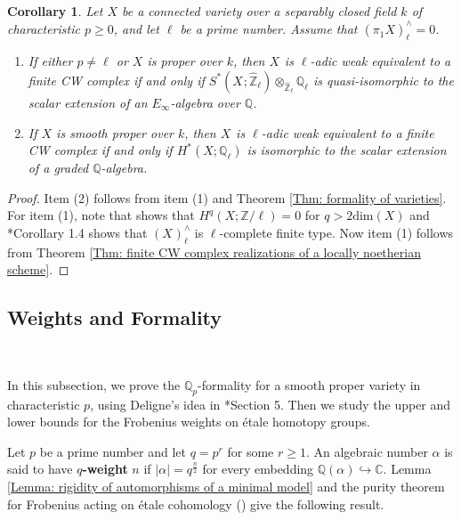 \documentclass[11pt]{amsart}
\newtheorem{corollary}[theorem]{Corollary}
\theoremstyle{definition}
\numberwithin{equation}{section}
\numberwithin{equation}{section}
\newcommand\QQ{\mathbb{Q}}
\newcommand\CC{\mathbb{C}}
\newcommand\ZZ{\mathbb{Z}}
\DeclareMathOperator{\et}{\acute{e}t}
\begin{document}
\begin{corollary}\label{Cor: finite CW complex for positive haract3eristic variety}
Let $X$ be a connected variety over a separably closed field $k$ of characteristic $p\geq 0$, and let $\ell$ be a prime number. Assume that $(\pi_1^{\et}X)^{\wedge}_{\ell}=0$.
\begin{enumerate}[leftmargin=0.25in]
    \item If either $p\neq \ell$ or $X$ is proper over $k$, then $X_{\et}$ is $\ell$-adic weak equivalent to a finite CW complex if and only if $S^*(X_{\et};\widehat{\ZZ}_{\ell})\otimes_{\widehat{\ZZ}_{\ell}} \QQ_{\ell}$ is quasi-isomorphic to the scalar extension of an $E_{\infty}$-algebra over $\QQ$.
    \item If $X$ is smooth proper over $k$, then $X_{\et}$ is $\ell$-adic weak equivalent to a finite CW complex if and only if $H^*_{\et}(X;\QQ_{\ell})$ is isomorphic to the scalar extension of a graded $\QQ$-algebra. 
\end{enumerate}
\end{corollary}

\begin{proof}
Item (2) follows from item (1) and Theorem \ref{Thm: formality of varieties}. For item (1), note that \cite[VI, Theorem 1.1]{milneLEC} shows that $H^q_{\et}(X;\mathbb{Z}/\ell)=0$ for $q> 2 \mathrm{dim}(X)$ and \cite{Hu-Zhang-formal-manifold-structures}*{Corollary 1.4} shows that $(X_{\et})^{\wedge}_{\ell}$ is $\ell$-complete finite type. Now item (1) follows from Theorem \ref{Thm: finite CW complex realizations of a locally noetherian scheme}.
\end{proof}

\subsection{Weights and Formality}\label{Subsec: Formality}\,

In this subsection, we prove the $\QQ_{p}$-formality for a smooth proper variety in characteristic $p$, using Deligne's idea in \cite{Deligne-Weil-II}*{Section 5}. Then we study the upper and lower bounds for the Frobenius weights on \'etale homotopy groups. 

Let $p$ be a prime number and let $q=p^{r}$ for some $r\geq 1$.  An algebraic number $\alpha$ is said to have \textbf{$q$-weight} $n$ if $|\alpha|=q^{\frac{n}{2}}$ for every embedding $\QQ(\alpha)\hookrightarrow \CC$. Lemma \ref{Lemma: rigidity of automorphisms of a minimal model} and the purity theorem for Frobenius acting on \'etale cohomology (\cite{Deligne-Weil-II}\cite{Chiarellotto-le-Stum-on-purity-of-crystalline-cohomology}\cite{Milne-values-of-zeta-functions-of-varieties-over-finite-fields}) give the following result.
\end{document}
